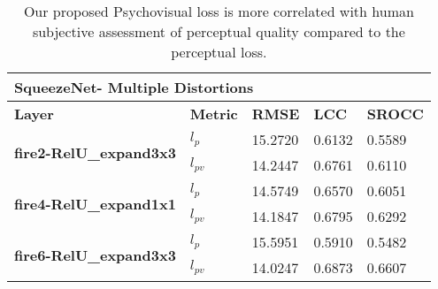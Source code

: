\documentclass[10pt,twocolumn,letterpaper]{article}
\begin{document}
\begin{table*}[]
\centering
\caption{Our proposed Psychovisual loss is more correlated with human subjective assessment of perceptual quality compared to the perceptual loss.}
\begin{tabular}{|l|l|l|l|l|}
\hline
\multicolumn{5}{|l|}{\textbf{SqueezeNet- Multiple Distortions}}                                                   \\ \hline
\textbf{Layer}                                  & \textbf{Metric} & \textbf{RMSE} & \textbf{LCC} & \textbf{SROCC} \\ \hline
\multirow{2}{*}{\textbf{fire2-RelU\_expand3x3}} & \textbf{$l_{p}$}              & 15.2720       & 0.6132       & 0.5589         \\ \cline{2-5}
                                                & \textbf{$l_{pv}$}             & 14.2447       & 0.6761       & 0.6110         \\ \hline
\multirow{2}{*}{\textbf{fire4-RelU\_expand1x1}} & \textbf{$l_{p}$}              & 14.5749       & 0.6570       & 0.6051         \\ \cline{2-5}
                                                & \textbf{$l_{pv}$}             & 14.1847       & 0.6795       & 0.6292         \\ \hline
\multirow{2}{*}{\textbf{fire6-RelU\_expand3x3}} & \textbf{$l_{p}$}              & 15.5951       & 0.5910       & 0.5482         \\ \cline{2-5}
                                                & \textbf{$l_{pv}$}             & 14.0247       & 0.6873       & 0.6607         \\ \hline
\end{tabular}
\end{table*}
\end{document}
